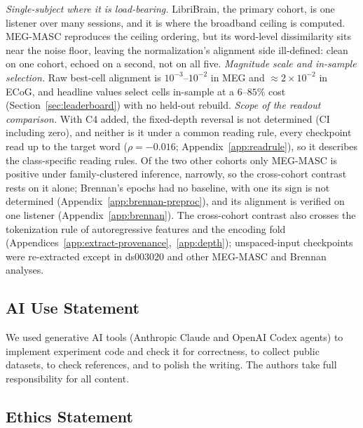 \documentclass{article}
\begin{document}
\emph{Single-subject where it is load-bearing.} LibriBrain, the primary cohort, is one listener
over many sessions, and it is where the broadband ceiling is computed. MEG-MASC reproduces the
ceiling ordering, but its word-level dissimilarity sits near the noise floor, leaving the
normalization's alignment side ill-defined: clean on one cohort, echoed on a second, not on all
five. \emph{Magnitude scale and in-sample selection.} Raw best-cell alignment is $10^{-3}$--$10^{-2}$ in MEG
and $\approx2\times10^{-2}$ in ECoG, and headline values select cells in-sample at a $6$--$85\%$ cost
(Section~\ref{sec:leaderboard}) with no held-out rebuild. \emph{Scope of the readout comparison.}
With C4 added, the fixed-depth reversal is not determined (CI including zero), and neither is it
under a common reading rule, every checkpoint read up to the target word ($\rho=-0.016$; Appendix~\ref{app:readrule}),
so it describes the class-specific reading rules. Of the two other cohorts only MEG-MASC is positive
under family-clustered inference, narrowly, so the cross-cohort contrast rests on it alone; Brennan's
epochs had no baseline, with one its sign is not determined (Appendix~\ref{app:brennan-preproc}), and its
alignment is verified on one listener (Appendix~\ref{app:brennan}). The
cross-cohort contrast also crosses the tokenization rule of autoregressive features and the encoding
fold (Appendices~\ref{app:extract-provenance},~\ref{app:depth}); unspaced-input
checkpoints were re-extracted except in ds003020 and other MEG-MASC and Brennan analyses.

\subsection*{AI Use Statement}

We used generative AI tools (Anthropic Claude and OpenAI Codex agents) to implement experiment
code and check it for correctness, to collect public datasets, to check references, and to polish
the writing. The authors take full responsibility for all content.

\subsection*{Ethics Statement}\label{ethics}
\end{document}

